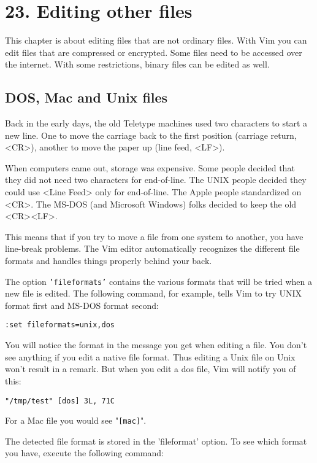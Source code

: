 \section{23. Editing other files}
This chapter is about editing files that are not ordinary files.  With Vim you
can edit files that are compressed or encrypted.  Some files need to be
accessed over the internet.  With some restrictions, binary files can be
edited as well.
\subsection{DOS, Mac and Unix files}
Back in the early days, the old Teletype machines used two characters to start a new line.
One to move the carriage back to the first position (carriage return, <CR>), another to move the paper up (line feed, <LF>).

When computers came out, storage was expensive.
Some people decided that they did not need two characters for end-of-line.
The UNIX people decided they could use <Line Feed> only for end-of-line.
The Apple people standardized on <CR>.
The MS-DOS (and Microsoft Windows) folks decided to keep the old <CR><LF>.

This means that if you try to move a file from one system to another, you have line-break problems.
The Vim editor automatically recognizes the different file formats and handles things properly behind your back.

The option \texttt{'fileformats'} contains the various formats that will be tried when a new file is edited.
The following command, for example, tells Vim to try UNIX format first and MS-DOS format second:

\begin{Verbatim}[samepage=true]
 :set fileformats=unix,dos
\end{Verbatim}

You will notice the format in the message you get when editing a file.
You don't see anything if you edit a native file format.
Thus editing a Unix file on Unix won't result in a remark.
But when you edit a dos file, Vim will notify you of this:

\begin{Verbatim}[samepage=true]
    "/tmp/test" [dos] 3L, 71C 
\end{Verbatim}

For a Mac file you would see "\texttt{[mac]}".

The detected file format is stored in the 'fileformat' option.
To see which format you have, execute the following command:

